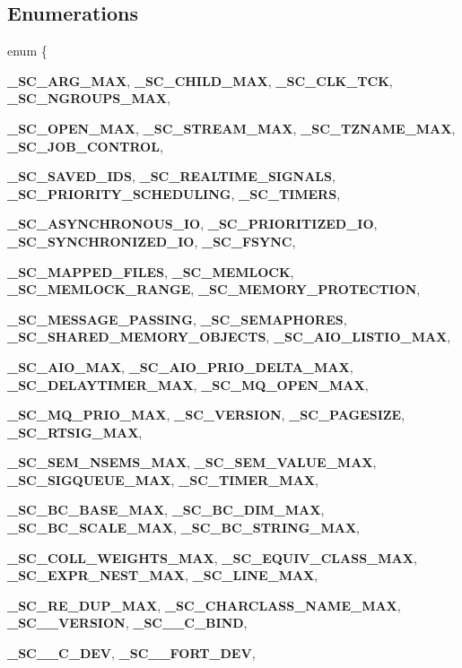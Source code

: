 \subsection*{Enumerations}
\begin{DoxyCompactItemize}
\item 
enum \{ \par
{\bf \_\-SC\_\-ARG\_\-MAX}, 
{\bf \_\-SC\_\-CHILD\_\-MAX}, 
{\bf \_\-SC\_\-CLK\_\-TCK}, 
{\bf \_\-SC\_\-NGROUPS\_\-MAX}, 
\par
{\bf \_\-SC\_\-OPEN\_\-MAX}, 
{\bf \_\-SC\_\-STREAM\_\-MAX}, 
{\bf \_\-SC\_\-TZNAME\_\-MAX}, 
{\bf \_\-SC\_\-JOB\_\-CONTROL}, 
\par
{\bf \_\-SC\_\-SAVED\_\-IDS}, 
{\bf \_\-SC\_\-REALTIME\_\-SIGNALS}, 
{\bf \_\-SC\_\-PRIORITY\_\-SCHEDULING}, 
{\bf \_\-SC\_\-TIMERS}, 
\par
{\bf \_\-SC\_\-ASYNCHRONOUS\_\-IO}, 
{\bf \_\-SC\_\-PRIORITIZED\_\-IO}, 
{\bf \_\-SC\_\-SYNCHRONIZED\_\-IO}, 
{\bf \_\-SC\_\-FSYNC}, 
\par
{\bf \_\-SC\_\-MAPPED\_\-FILES}, 
{\bf \_\-SC\_\-MEMLOCK}, 
{\bf \_\-SC\_\-MEMLOCK\_\-RANGE}, 
{\bf \_\-SC\_\-MEMORY\_\-PROTECTION}, 
\par
{\bf \_\-SC\_\-MESSAGE\_\-PASSING}, 
{\bf \_\-SC\_\-SEMAPHORES}, 
{\bf \_\-SC\_\-SHARED\_\-MEMORY\_\-OBJECTS}, 
{\bf \_\-SC\_\-AIO\_\-LISTIO\_\-MAX}, 
\par
{\bf \_\-SC\_\-AIO\_\-MAX}, 
{\bf \_\-SC\_\-AIO\_\-PRIO\_\-DELTA\_\-MAX}, 
{\bf \_\-SC\_\-DELAYTIMER\_\-MAX}, 
{\bf \_\-SC\_\-MQ\_\-OPEN\_\-MAX}, 
\par
{\bf \_\-SC\_\-MQ\_\-PRIO\_\-MAX}, 
{\bf \_\-SC\_\-VERSION}, 
{\bf \_\-SC\_\-PAGESIZE}, 
{\bf \_\-SC\_\-RTSIG\_\-MAX}, 
\par
{\bf \_\-SC\_\-SEM\_\-NSEMS\_\-MAX}, 
{\bf \_\-SC\_\-SEM\_\-VALUE\_\-MAX}, 
{\bf \_\-SC\_\-SIGQUEUE\_\-MAX}, 
{\bf \_\-SC\_\-TIMER\_\-MAX}, 
\par
{\bf \_\-SC\_\-BC\_\-BASE\_\-MAX}, 
{\bf \_\-SC\_\-BC\_\-DIM\_\-MAX}, 
{\bf \_\-SC\_\-BC\_\-SCALE\_\-MAX}, 
{\bf \_\-SC\_\-BC\_\-STRING\_\-MAX}, 
\par
{\bf \_\-SC\_\-COLL\_\-WEIGHTS\_\-MAX}, 
{\bf \_\-SC\_\-EQUIV\_\-CLASS\_\-MAX}, 
{\bf \_\-SC\_\-EXPR\_\-NEST\_\-MAX}, 
{\bf \_\-SC\_\-LINE\_\-MAX}, 
\par
{\bf \_\-SC\_\-RE\_\-DUP\_\-MAX}, 
{\bf \_\-SC\_\-CHARCLASS\_\-NAME\_\-MAX}, 
{\bf \_\-SC\_\_\-VERSION}, 
{\bf \_\-SC\_\_\-C\_\-BIND}, 
\par
{\bf \_\-SC\_\_\-C\_\-DEV}, 
{\bf \_\-SC\_\_\-FORT\_\-DEV}, 

\end{DoxyCompactItemize}
